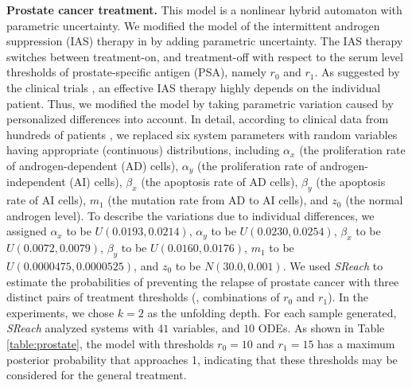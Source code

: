 \vspace{-.2cm}
{\bf\noindent Prostate cancer treatment.}
This model is a nonlinear hybrid automaton with parametric uncertainty. We modified the model of the intermittent androgen suppression (IAS) therapy in \cite{tanaka2010mathematical} by adding parametric uncertainty. The IAS therapy switches between  treatment-on, and treatment-off with respect to the serum level thresholds of prostate-specific antigen (PSA), namely $r_0$ and $r_1$. As suggested by the clinical trials \cite{bruchovsky2006final}, an effective IAS therapy highly depends on the individual patient. Thus, we modified the model by taking parametric variation caused by personalized differences into account. In detail, according to clinical data from hundreds of patients \cite{bruchovsky2007locally}, we replaced six system parameters with random variables having appropriate (continuous) distributions, including $\alpha_x$ (the proliferation rate of androgen-dependent (AD) cells), $\alpha_y$ (the proliferation rate of androgen-independent (AI) cells), $\beta_x$ (the apoptosis rate of AD cells), $\beta_y$ (the apoptosis rate of AI cells), $m_1$ (the mutation rate from AD to AI cells), and $z_0$ (the normal androgen level). To describe the variations due to individual differences, we assigned $\alpha_x$ to be $U(0.0193, 0.0214)$, $\alpha_y$ to be $U(0.0230, 0.0254)$, $\beta_x$ to be $U(0.0072, 0.0079)$, $\beta_y$ to be $U(0.0160, 0.0176)$, $m_1$ to be $U(0.0000475, 0.0000525) $, and $z_0$ to be $N(30.0, 0.001)$. We used {\it SReach} to estimate the probabilities of preventing the relapse of prostate cancer with three distinct pairs of treatment thresholds (\ie, combinations of $r_0$ and $r_1$).  In the experiments, we chose $k=2$ as the unfolding depth. For each sample generated, {\it SReach} analyzed systems with $41$ variables, and $10$ ODEs. As shown in Table \ref{table:prostate}, the model with thresholds $r_0 = 10$ and $r_1 = 15$ has a maximum posterior probability that approaches 1, indicating that these thresholds may be considered for the general treatment. 

